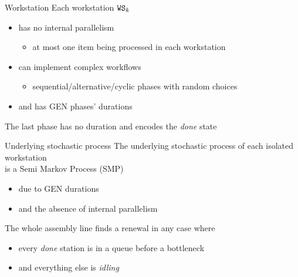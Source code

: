     \begin{frame}{Workstation}
      Each workstation $\mathtt{WS}_k$
      \begin{itemize}
        \item has no internal parallelism
        \begin{itemize}
          \item at most one item being processed in each workstation
        \end{itemize}
        \item can implement complex workflows
        \begin{itemize}
          \item sequential/alternative/cyclic phases with random choices
        \end{itemize}
        \item and has GEN phases' durations
      \end{itemize}
      
      \begin{center}\scalebox{0.7}{}\end{center}
      
      The last phase has no duration and encodes the \textit{done} state
    \end{frame}
    
    \begin{frame}{Underlying stochastic process}
      The underlying stochastic process of each isolated workstation\\
      is a Semi Markov Process (SMP)
      \begin{itemize}
        \item due to GEN durations
        \item and the absence of internal parallelism
      \end{itemize}
      
      \vspace{1.5em}
      The whole assembly line finds a renewal in any case where
      \begin{itemize}
        \item every \textit{done} station is in a queue before a bottleneck
        \item and everything else is \textit{idling}
      \end{itemize}
      
      \begin{center}\scalebox{0.8}{}\end{center}
    \end{frame}
  
